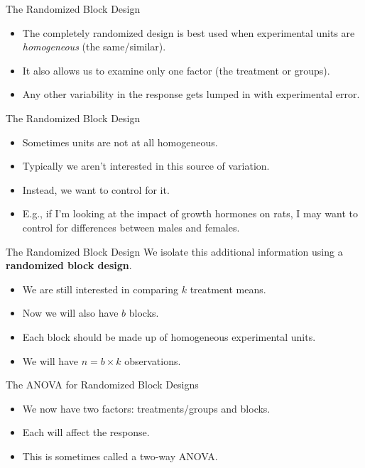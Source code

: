 \begin{frame}{The Randomized Block Design}
    \begin{itemize}
        \item The completely randomized design is best used when experimental units are \textit{homogeneous} (the same/similar).
        \item It also allows us to examine only one factor (the treatment or groups).
        \item Any other variability in the response gets lumped in with experimental error.
    \end{itemize}
\end{frame}

\begin{frame}{The Randomized Block Design}
    \begin{itemize}
        \item Sometimes units are not at all homogeneous.
        \item Typically we aren't interested in this source of variation.
        \item Instead, we want to control for it.
        \item E.g., if I'm looking at the impact of growth hormones on rats, I may want to control for differences between males and females.
    \end{itemize}
\end{frame}

\begin{frame}{The Randomized Block Design}
    We isolate this additional information using a \textbf{randomized block design}.
    \begin{itemize}
        \item We are still interested in comparing $k$ treatment means.
        \item Now we will also have $b$ blocks.
        \item Each block should be made up of homogeneous experimental units.
        \item We will have $n = b\times k$ observations.
    \end{itemize}
\end{frame}

\begin{frame}{The ANOVA for Randomized Block Designs}
    \begin{itemize}
        \item We now have two factors: treatments/groups and blocks.
        \item Each will affect the response.
        \item This is sometimes called a two-way ANOVA.
    \end{itemize}
\end{frame}

